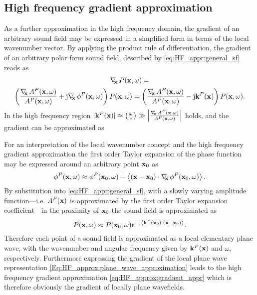\subsection{High frequency gradient approximation}
As a further approximation in the high frequency domain, the gradient of an arbitrary sound field may be expressed in a simplified form in terms of the local wavenumber vector.
By applying the product rule of differentiation, the gradient of an arbitrary polar form sound field, described by \eqref{eq:HF_appr:general_sf} reads as
\begin{multline}
\Dx P(\vx,\omega) = \\ \left(  \frac{\Dx A^P(\vx,\omega)}{A^P(\vx,\omega)} + \ti \Dx \phi^P(\vx,\omega) \right) P(\vx,\omega) =  \left(  \frac{\Dx A^P(\vx,\omega)}{A^P(\vx,\omega)} - \ti \vk^P(\vx) \right) P(\vx,\omega).
\end{multline}
In the high frequency region $|\mathbf{k}^P(\mathbf{x})| \approx \left( \frac{\omega}{c} \right) \gg \left| \frac{ \nabla_{\!\!\mathbf{x}}\, A^P(\mathbf{x},\omega)}{A^P(\mathbf{x},\omega)} \right|$ holds, and the gradient can be approximated as

\vspace{3mm}
For an interpretation of the local wavenumber concept and the high frequency gradient approximation the first order Taylor expansion of the phase function may be expressed around an arbitrary point $\mathbf{x}_0$ as
\begin{equation}
\phi^P(\mathbf{x},\omega) \approx \phi^P(\mathbf{x}_0,\omega) + \left< (\mathbf{x}-\mathbf{x}_0) \cdot \nabla_{\!\!\mathbf{x}}\, \phi^P(\mathbf{x}_0,\omega) \right>.
\end{equation}
By substitution into \eqref{eq:HF_appr:general_sf}, with a slowly varying amplitude function---i.e. $A^P(\mathbf{x})$ is approximated by the first order Taylor expansion coefficient---in the proximity of $\mathbf{x}_0$ the sound field is approximated as
\begin{equation}
\label{Eq:HF_approx:plane_wave_approximation}
P(\mathbf{x},\omega) \approx P(\mathbf{x}_0,\omega) \mathrm{e}^{-\mathrm{j}  \left< \mathbf{k}^P(\mathbf{x}_0) \cdot \left( \mathbf{x} - \mathbf{x}_0 \right) \right>}.
\end{equation}
Therefore each point of a sound field is approximated as a local elementary plane wave, with the wavenumber and angular frequency given by $\mathbf{k}^P(\mathbf{x})$ and $\omega$, respectively.
Furthermore expressing the gradient of the local plane wave representation \eqref{Eq:HF_approx:plane_wave_approximation} leads to the high frequency gradient approximation \eqref{eq:HF_approx:gradient_appr} which is therefore obviously the gradient of locally plane wavefields.

